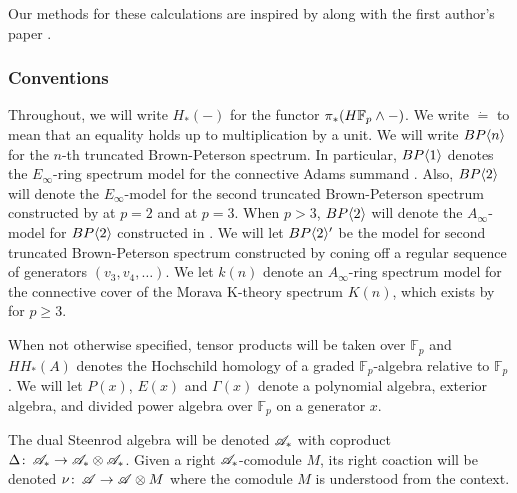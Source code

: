 Our methods for these calculations are inspired by \cites{McClureStaffeldt,AngeltveitRognes,AHL} along with the first author's paper \cite{THHK1-local}.

\subsubsection*{Conventions}
Throughout, we will write $H_*(-)$ for the functor $\pi_*(H\mathbb{F}_p\wedge -)$. We write $\dot{=}$ to mean that an equality holds up to multiplication by a unit. We will write $BP\langle n \rangle$ for the $n$-th truncated Brown-Peterson spectrum. In particular, $BP\langle 1 \rangle$ denotes the $E_{\infty}$-ring spectrum model for the connective Adams summand \cite{qx}. Also, $BP\langle 2 \rangle$ will denote the $E_{\infty}$-model for the second truncated Brown-Peterson spectrum constructed by \cite{qx} at $p=2$ and \cite{qx} at $p=3$. When $p>3$, $BP\langle 2 \rangle$ will denote the $A_{\infty}$-model for $BP\langle 2 \rangle$ constructed in \cite{qx}. We will let $BP\langle 2 \rangle^{\prime}$ be the model for second truncated Brown-Peterson spectrum constructed by coning off a regular sequence of generators $(v_3,v_4, \ldots)$. We let $k(n)$ denote an $A_{\infty}$-ring spectrum model for the connective cover of the Morava K-theory spectrum $K(n)$, which exists by \cite{qx} for $p\ge 3$. 

When not otherwise specified, tensor products will be taken over $\mathbb{F}_p$ and $HH_*(A)$ denotes the Hochschild homology of a graded $\mathbb{F}_p$-algebra relative to $\mathbb{F}_p$. We will let $P(x)$, $E(x)$ and $\Gamma(x)$ denote a polynomial algebra, exterior algebra, and divided power algebra over $\mathbb{F}_p$ on a generator $x$. 

The dual Steenrod algebra will be denoted $\mathscr{A}_*$ with coproduct $\Delta\colon \thinspace \mathscr{A}_*\to \mathscr{A}_*\otimes \mathscr{A}_*$. Given a right $\mathscr{A}_*$-comodule $M$, its right coaction will be denoted $\nu\colon \thinspace \mathscr{A}\to \mathscr{A}\otimes M$ where the comodule $M$ is understood from the context. 